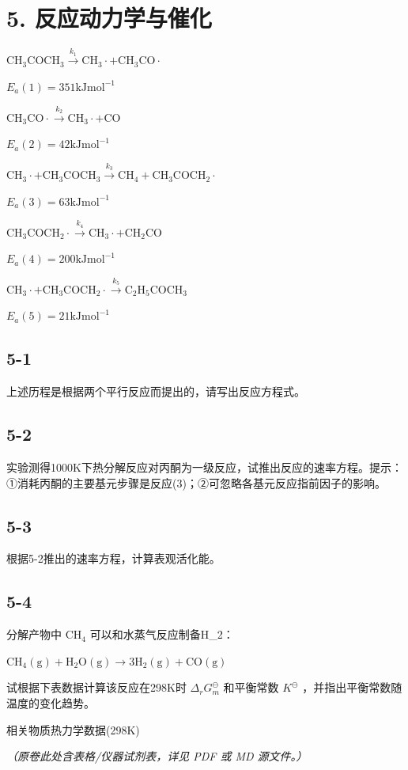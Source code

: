 \section*{5. 反应动力学与催化}
$
\mathrm{CH} _ {3} \mathrm{COCH} _ {3} \xrightarrow {k _ {1}} \mathrm{CH} _ {3} \cdot + \mathrm{CH} _ {3} \mathrm{CO} \cdot
$

$
E _ {a} (1) = 3 5 1 \mathrm{kJ} \mathrm{mol} ^ {- 1}
$

$
\mathrm{CH} _ {3} \mathrm{CO} \cdot \xrightarrow {k _ {2}} \mathrm{CH} _ {3} \cdot + \mathrm{CO}
$

$
E _ {a} (2) = 4 2 \mathrm{kJ} \mathrm{mol} ^ {- 1}
$

$
\mathrm{CH} _ {3} \cdot + \mathrm{CH} _ {3} \mathrm{COCH} _ {3} \xrightarrow {k _ {3}} \mathrm{CH} _ {4} + \mathrm{CH} _ {3} \mathrm{COCH} _ {2} \cdot
$

$
E _ {a} (3) = 6 3 \mathrm{kJ} \mathrm{mol} ^ {- 1}
$

$
\mathrm{CH} _ {3} \mathrm{COCH} _ {2} \cdot \xrightarrow {k _ {4}} \mathrm{CH} _ {3} \cdot + \mathrm{CH} _ {2} \mathrm{CO}\tag{4}
$

$
E _ {a} (4) = 2 0 0 \mathrm{kJ} \mathrm{mol} ^ {- 1}
$

$
\mathrm{CH} _ {3} \cdot + \mathrm{CH} _ {3} \mathrm{COCH} _ {2} \cdot \xrightarrow {k _ {5}} \mathrm{C} _ {2} \mathrm{H} _ {5} \mathrm{COCH} _ {3}
$

$
E _ {a} (5) = 2 1 \mathrm{kJ} \mathrm{mol} ^ {- 1}
$

\subsection*{5-1}
上述历程是根据两个平⾏反应⽽提出的，请写出反应⽅程式。

\subsection*{5-2}
实验测得1000K下热分解反应对丙酮为⼀级反应，试推出反应的速率⽅程。提⽰：①消耗丙酮的主要基元步骤是反应(3)；②可忽略各基元反应指前因⼦的影响。

\subsection*{5-3}
根据5-2推出的速率⽅程，计算表观活化能。

\subsection*{5-4}
分解产物中 $\mathrm { C H _ { 4 } }$ 可以和⽔蒸⽓反应制备H_{2}：

$
\mathrm{CH} _ {4} (\mathrm{g}) + \mathrm{H} _ {2} \mathrm{O} (\mathrm{g}) \rightarrow 3 \mathrm{H} _ {2} (\mathrm{g}) + \mathrm{CO} (\mathrm{g})
$

试根据下表数据计算该反应在298K时 $\Delta _ { r } G _ { m } ^ { \ominus }$ 和平衡常数 $K ^ { \ominus }$ ，并指出平衡常数随温度的变化趋势。

相关物质热⼒学数据(298K)

\textit{（原卷此处含表格/仪器试剂表，详见 PDF 或 MD 源文件。）}
